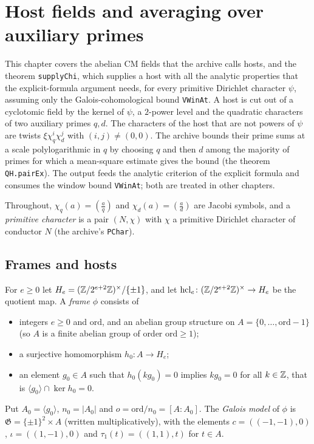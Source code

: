 \chapter{Host fields and averaging over auxiliary primes}\label{ch:host}

This chapter covers the abelian CM fields that the archive calls hosts, and
the theorem \texttt{supplyChi}, which supplies a host with all the analytic
properties that the explicit-formula argument needs, for every primitive
Dirichlet character $\psi$, assuming only the Galois-cohomological bound
\texttt{VWinAt}. A host is cut out of a cyclotomic field by the kernel of
$\psi$, a $2$-power level and the quadratic characters of two auxiliary
primes $q,d$. The characters of the host that are not powers of $\psi$ are
twists $\xi\chi_q^i\chi_d^j$ with $(i,j)\ne(0,0)$. The archive bounds their
prime sums at a scale polylogarithmic in $q$ by choosing $q$ and then $d$
among the majority of primes for which a mean-square estimate gives the
bound (the theorem \texttt{QH.pairEx}). The output feeds the analytic
criterion of the explicit formula and consumes the window bound
\texttt{VWinAt}; both are treated in other chapters.

Throughout, $\chi_q(a)=\left(\frac aq\right)$ and $\chi_d(a)=\left(\frac
ad\right)$ are Jacobi symbols, and a \emph{primitive character} is a pair
$(N,\chi)$ with $\chi$ a primitive Dirichlet character of conductor $N$
(the archive's \texttt{PChar}).

\section{Frames and hosts}

\begin{definition}[frame]\label{host:frame}
For $e\ge0$ let $H_e=(\mathbb{Z}/2^{e+2}\mathbb{Z})^{\times}/\{\pm1\}$, and let
$\operatorname{hcl}_e\colon(\mathbb{Z}/2^{e+2}\mathbb{Z})^{\times}\to H_e$ be the quotient map.
A \emph{frame} $\phi$ consists of
\begin{itemize}
\item integers $e\ge0$ and $\mathrm{ord}$, and an abelian group structure on
  $A=\{0,\dots,\mathrm{ord}-1\}$ (so $A$ is a finite abelian group of order
  $\mathrm{ord}\ge1$);
\item a surjective homomorphism $h_0\colon A\to H_e$;
\item an element $g_0\in A$ such that $h_0(kg_0)=0$ implies $kg_0=0$ for all
  $k\in\mathbb{Z}$, that is $\langle g_0\rangle\cap\ker h_0=0$.
\end{itemize}
Put $A_0=\langle g_0\rangle$, $n_0=|A_0|$ and $o=\mathrm{ord}/n_0=[A:A_0]$.
The \emph{Galois model} of $\phi$ is $\mathfrak G=\{\pm1\}^2\times A$
(written multiplicatively), with the elements $c=((-1,-1),0)$,
$\iota=((1,-1),0)$ and $\tau_1(t)=((1,1),t)$ for $t\in A$.
\end{definition}


